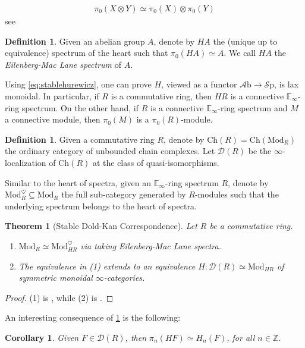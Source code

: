 \documentclass[10pt]{amsart}
\newcommand{\D}{\mathscr{D}}
\newcommand{\bE}{\mathbb{E}}
\newcommand{\bZ}{\mathbb{Z}}
\newcommand{\Sp}{\mathscr{S}\mathrm{p}}
\newcommand{\Ch}{\mathrm{Ch}}
\newcommand{\Mod}{\mathrm{Mod}}
\newcommand{\Ab}{\mathscr{A}\mathrm{b}}
\newcommand{\nrnote}[1]{\todo[color=green!40,linecolor=green!40!black,size=\tiny]{#1}}
\newtheorem{theorem}[equation]{Theorem}
\newtheorem{corollary}[equation]{Corollary}
\theoremstyle{definition}
\newtheorem{definition}[equation]{Definition}
\theoremstyle{remark}
\numberwithin{equation}{section}
\begin{document}
\begin{align}\label{eq:stablehurewicz}
  \pi_0(X\otimes Y)\simeq\pi_0(X)\otimes\pi_0(Y)
\end{align}
see \cite[Theorem 2.3.28]{davies2024atii}

\begin{definition}Given an abelian group $A$, denote by $HA$ the (unique up to equivalence) spectrum of the heart such that $\pi_0(HA)\simeq A$. We call $HA$ the \emph{Eilenberg-Mac Lane spectrum} of $A$.
\end{definition}
Using \cref{eq:stablehurewicz}, one can prove $H$, viewed as a functor $\Ab\to\Sp$, is lax monoidal\nrnote{Why do you say lax here?}. In particular, if $R$ is a commutative ring, then $HR$ is a connective $\bE_\infty$-ring spectrum. On the other hand, if $R$ is a connective $\bE_\infty$-ring spectrum and $M$ a connective module, then $\pi_0(M)$ is a $\pi_0(R)$-module. 
\begin{definition}
  Given a commutative ring $R$, denote by $\Ch(R)=\Ch(\Mod_{R})$ the ordinary category of unbounded chain complexes. Let $\D(R)$ be the $\infty$-localization of $\Ch(R)$ at the class of quasi-isomorphisms.  
\end{definition} 
Similar to the heart of spectra, given an $\bE_\infty$-ring spectrum $R$, denote by $\Mod_{R}^\heartsuit\subseteq \Mod_{R}$ the full sub-category generated by $R$-modules such that the underlying spectrum belongs to the heart of spectra. 
\begin{theorem}[Stable Dold-Kan Correspondence]\label{thm:stabledk}
  Let $R$ be a commutative ring. 
  \begin{enumerate}
    \item $\Mod_{R}\simeq \Mod_{HR}^\heartsuit$ via taking Eilenberg-Mac Lane spectra.
    \item The equivalence in (1) extends to an equivalence $H:\D(R)\simeq \Mod_{HR}$ of symmetric monoidal $\infty$-categories.
  \end{enumerate} 
\end{theorem}
\begin{proof}
  (1) is \cite[Proposition 7.1.1.13]{lurie2017ha}, while (2) is \cite[Theorem 7.1.2.13]{lurie2017ha}.
\end{proof}
An interesting consequence of \cref{thm:stabledk} is the following:
\begin{corollary}\label{cor:homotopyvshomology}
  Given $F\in\D(R)$, then $\pi_n(HF)\simeq H_n(F)$, for all $n\in\bZ$.
\end{corollary}
\end{document}
